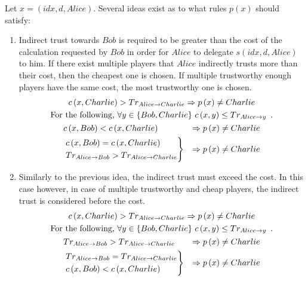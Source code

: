   Let $x = \left(idx, d, Alice\right)$. Several ideas exist as to what rules $p\left(x\right)$ should satisfy:
  \begin{enumerate}
    \item Indirect trust towards $Bob$ is required to be greater than the cost of the calculation requested by $Bob$ in order
    for $Alice$ to delegate $s\left(idx, d, Alice\right)$ to him. If there exist multiple players that $Alice$ indirectly
    trusts more than their cost, then the cheapest one is chosen. If multiple trustworthy enough players have the same cost,
    the most trustworthy one is chosen.
    \begin{gather*}
        c\left(x, Charlie\right) > Tr_{Alice \rightarrow Charlie} \Rightarrow p\left(x\right) \neq Charlie \\
	\mbox{For the following, } \forall y \in \{Bob, Charlie\} \ c\left(x, y\right) \leq Tr_{Alice \rightarrow y} \enspace.
	\\
      \begin{aligned}
        & c\left(x, Bob\right) < c\left(x, Charlie\right) & \Rightarrow p\left(x\right) \neq Charlie  \\
        &
        \begin{rcases}
          c\left(x, Bob\right) = c\left(x, Charlie\right) \\
  	Tr_{Alice \rightarrow Bob} > Tr_{Alice \rightarrow Charlie}
        \end{rcases}
        & \Rightarrow p\left(x\right) \neq Charlie
      \end{aligned}
    \end{gather*}
    \item Similarly to the previous idea, the indirect trust must exceed the cost. In this case however, in case of multiple
    trustworthy and cheap players, the indirect trust is considered before the cost.
    \begin{gather*}
        c\left(x, Charlie\right) > Tr_{Alice \rightarrow Charlie} \Rightarrow p\left(x\right) \neq Charlie \\
	\mbox{For the following, } \forall y \in \{Bob, Charlie\} \ c\left(x, y\right) \leq Tr_{Alice \rightarrow y} \enspace.
	\\
      \begin{aligned}
        & Tr_{Alice \rightarrow Bob} > Tr_{Alice \rightarrow Charlie} & \Rightarrow p\left(x\right) \neq Charlie \\
        &
        \begin{rcases}
          Tr_{Alice \rightarrow Bob} = Tr_{Alice \rightarrow Charlie} \\
  	  c\left(x, Bob\right) < c\left(x, Charlie\right)
        \end{rcases}
        & \Rightarrow p\left(x\right) \neq Charlie
      \end{aligned}
    \end{gather*}
  \end{enumerate}
